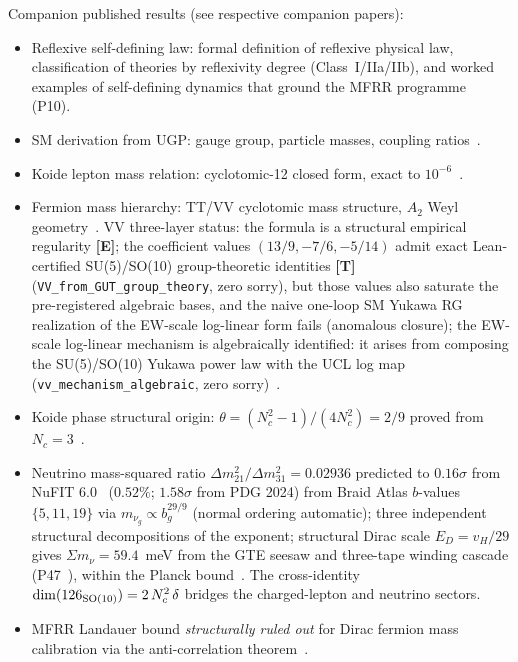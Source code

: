\documentclass[11pt]{article}
\theoremstyle{plain}
\theoremstyle{definition}
\theoremstyle{remark}
\begin{document}
Companion published results (see respective companion papers):
\begin{itemize}[nosep]
\item Reflexive self-defining law: formal definition of reflexive physical law,
  classification of theories by reflexivity degree (Class~I/IIa/IIb), and worked examples
  of self-defining dynamics that ground the MFRR programme~\cite{SpivackReflexiveLaw} (P10).
\item SM derivation from UGP: gauge group, particle masses, coupling ratios~\cite{Spivack2026_SM_UGP}.
\item Koide lepton mass relation: cyclotomic-12 closed form, exact to $10^{-6}$~\cite{Spivack2026_Koide}.
\item Fermion mass hierarchy: TT/VV cyclotomic mass structure, $A_2$ Weyl geometry~\cite{Spivack2026_CyclotomicMass}.
  VV three-layer status: the formula is a structural empirical regularity \textbf{[E]};
  the coefficient values $(13/9,-7/6,-5/14)$ admit exact Lean-certified SU(5)/SO(10)
  group-theoretic identities \textbf{[T]} (\texttt{VV\_from\_GUT\_group\_theory}, zero sorry),
  but those values also saturate the pre-registered algebraic bases,
  and the naive one-loop SM Yukawa RG realization of the EW-scale log-linear form fails
  (anomalous closure); the EW-scale log-linear mechanism is algebraically identified: it arises from composing the SU(5)/SO(10) Yukawa power law with the UCL log map (\texttt{vv\_mechanism\_algebraic}, zero sorry)~\cite{Spivack2026_SM_UGP}.
\item Koide phase structural origin: $\theta = (N_c^2-1)/(4N_c^2) = 2/9$ proved from $N_c=3$~\cite{Spivack2026_Koide}.
\item Neutrino mass-squared ratio $\Delta m^2_{21}/\Delta m^2_{31} = 0.02936$ predicted to $0.16\sigma$ from NuFIT 6.0~\cite{NuFIT60} ($0.52\%$; $1.58\sigma$ from PDG 2024) from Braid Atlas $b$-values $\{5,11,19\}$ via $m_{\nu_g} \propto b_g^{29/9}$ (normal ordering automatic); three independent structural decompositions of the exponent; structural Dirac scale $E_D = v_H/29$ gives $\Sigma m_\nu = 59.4$~meV from the GTE seesaw and three-tape winding cascade (P47~\cite{SpivackGTECosmology}), within the Planck bound~\cite{Spivack2026_SM_UGP,SpivackNeutrino}.  The cross-identity $\dim(126_{\rm SO(10)}) = 2\,N_c^2\,\delta$ bridges the charged-lepton and neutrino sectors.
\item MFRR Landauer bound \emph{structurally ruled out} for Dirac fermion mass calibration via the anti-correlation theorem~\cite{Spivack2026_SM_UGP}.

\end{itemize}
\end{document}
